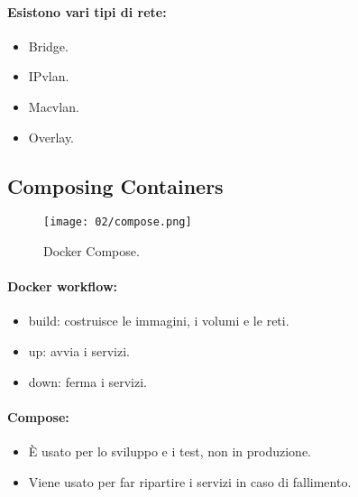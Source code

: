 \paragraph{Esistono vari tipi di rete:}

\begin{itemize}
	\item Bridge.
	\item IPvlan.
	\item Macvlan.
	\item Overlay.
\end{itemize}

\subsection{Composing Containers}


\begin{figure}[h]
	\centering
	\texttt{[image: 02/compose.png]}
	\caption{Docker Compose.}
\end{figure}


\paragraph{Docker workflow:}

\begin{itemize}
	\item build: costruisce le immagini, i volumi e le reti.
	\item up: avvia i servizi.
	\item down: ferma i servizi.
\end{itemize}

\paragraph{Compose:}

\begin{itemize}
	\item È usato per lo sviluppo e i test, non in produzione.
	\item Viene usato per far ripartire i servizi in caso di fallimento.
\end{itemize}
